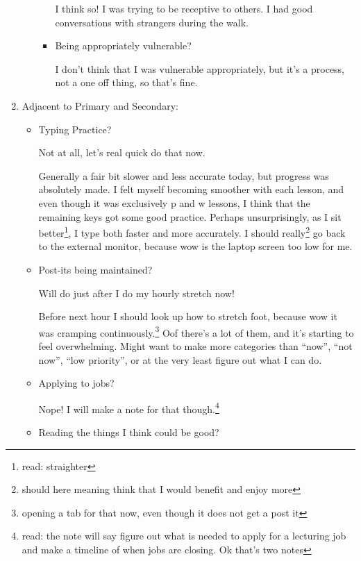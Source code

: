 \documentclass[12pt]{article}
\newcommand{\say}[1]{``#1''}
\renewcommand{\,}{\textsuperscript{,}}
\begin{document}
\begin{enumerate}
\begin{itemize}
\begin{itemize}
I think so! I was trying to be receptive to others.  
I had good conversations with strangers during the walk.

\item Being appropriately vulnerable?

I don't think that I was vulnerable appropriately, but it's a process, not a one off thing, so that's fine.

\end{itemize}

\end{itemize}

\item Adjacent to Primary and Secondary:

\begin{itemize}

\item Typing Practice?

Not at all, let's real quick do that now.

Generally a fair bit slower and less accurate today, but progress was absolutely made.  
I felt myself becoming smoother with each lesson, and even though it was exclusively p and w lessons, I think that the remaining keys got some good practice. Perhaps unsurprisingly, as I sit better\footnote{read: straighter}, I type both faster and more accurately. I should really\footnote{should here meaning think that I would benefit and enjoy more} go back to the external monitor, because wow is the laptop screen too low for me.

\item Post-its being maintained?

Will do just after I do my hourly stretch now!

Before next hour I should look up how to stretch foot, because wow it was cramping continuously.\footnote{opening a tab for that now, even though it does not get a post it}  
Oof there's a lot of them, and it's starting to feel overwhelming. Might want to make more categories than \say{now}, \say{not now}, \say{low priority}, or at the very least figure out what I can do.

\item Applying to jobs?

Nope! I will make a note for that though.\footnote{read: the note will say figure out what is needed to apply for a lecturing job and make a timeline of when jobs are closing. Ok that's two notes}

\item Reading the things I think could be good?


\end{itemize}
\end{enumerate}
\end{document}
